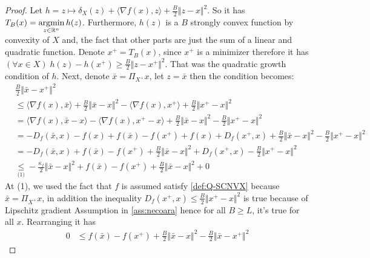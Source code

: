 \documentclass[12pt]{article}
\begin{document}
    \begin{proof}
        Let $h = z \mapsto \delta_X(z) + \langle \nabla f(x), z\rangle + \frac{B}{2}\Vert z - x\Vert^2$.
        So it has $T_B(x) = \mathop{\rm argmin}\limits_{z\in \mathbb R^n} h(z)$. 
        Furthermore, $h(z)$ is a $B$ strongly convex function by convexity of $X$ and, the fact that other parts are just the sum of a linear and quadratic function. 
        Denote $x^+ = T_B(x)$, since $x^+$ is a minimizer therefore it has $(\forall x \in X)\; h(z) - h(x^+) \ge \frac{B}{2}\Vert z - x^+\Vert^2$. 
        That was the quadratic growth condition of $h$. 
        Next, denote $\bar x  = \Pi_{X^+}x$, let $z = \bar x$ then the condition becomes: 
        \begin{align*}
            & \frac{B}{2}\Vert \bar x - x^+\Vert^2 
            \\
            &\le 
            \langle \nabla f(x), \bar x\rangle + \frac{B}{2}\Vert \bar x - x\Vert^2 - 
            \langle \nabla f(x), x^+\rangle + \frac{B}{2}\Vert x^+ - x\Vert^2
            \\
            &=
            \langle \nabla f(x), \bar x - x\rangle - \langle \nabla f(x), x^+ - x\rangle
            + \frac{B}{2}\Vert \bar x - x\Vert^2 
            - \frac{B}{2}\Vert x^+ - x\Vert^2
            \\
            &= - D_f(\bar x, x) - f(x) + f(\bar x) - f(x^+) + f(x) + D_f(x^+, x)
            + \frac{B}{2}\Vert \bar x - x\Vert^2 
            - \frac{B}{2}\Vert x^+ - x\Vert^2
            \\
            &= 
            - D_f(\bar x, x) + f(\bar x) - f(x^+) 
            + \frac{B}{2}\Vert \bar x - x\Vert^2 
            + D_f(x^+, x)
            - \frac{B}{2}\Vert x^+ - x\Vert^2
            \\
            &\underset{\text{(1)}}{\le} 
            - \frac{\kappa_f}{2}\Vert \bar x - x\Vert^2
            + f(\bar x) - f(x^+)
            + \frac{B}{2}\Vert \bar x - x\Vert^2 
            + 0
        \end{align*}
        At (1), we used the fact that $f$ is assumed satisfy \ref{def:Q-SCNVX} because $\bar x = \Pi_{X^+}x$, in addition the inequality $D_f(x^+, x) \le \frac{B}{2}\Vert x^+ - x\Vert^2$ is true because of Lipschitz gradient Assumption in \ref{ass:necoara} hence for all $B\ge L$, it's true for all $x$. 
        Rearranging it has 
        \begin{align*}
            0 &\le
            f(\bar x) - f(x^+) 
            + \frac{B}{2}\Vert \bar x - x\Vert^2 
            - \frac{B}{2}\Vert \bar x - x^+\Vert^2

\end{align*}
\end{proof}
\end{document}
